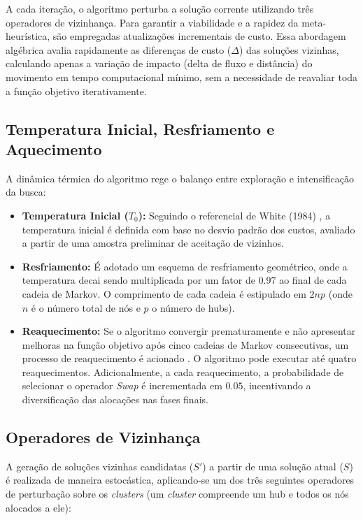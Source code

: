 A cada iteração, o algoritmo perturba a solução corrente utilizando três operadores de vizinhança. Para garantir a viabilidade e a rapidez da meta-heurística, são empregadas atualizações incrementais de custo. Essa abordagem algébrica avalia rapidamente as diferenças de custo ($\Delta$) das soluções vizinhas, calculando apenas a variação de impacto (delta de fluxo e distância) do movimento em tempo computacional mínimo, sem a necessidade de reavaliar toda a função objetivo iterativamente.

\subsection{Temperatura Inicial, Resfriamento e Aquecimento}

A dinâmica térmica do algoritmo rege o balanço entre exploração e intensificação da busca:

\begin{itemize}
    \item \textbf{Temperatura Inicial ($T_0$):} Seguindo o referencial de White (1984) \cite{white1984}, a temperatura inicial é definida com base no desvio padrão dos custos, avaliado a partir de uma amostra preliminar de aceitação de vizinhos.
    \item \textbf{Resfriamento:} É adotado um esquema de resfriamento geométrico, onde a temperatura decai sendo multiplicada por um fator de $0.97$ ao final de cada cadeia de Markov. O comprimento de cada cadeia é estipulado em $2np$ (onde $n$ é o número total de nós e $p$ o número de hubs).
    \item \textbf{Reaquecimento:} Se o algoritmo convergir prematuramente e não apresentar melhoras na função objetivo após cinco cadeias de Markov consecutivas, um processo de reaquecimento é acionado \cite{osman1993}. O algoritmo pode executar até quatro reaquecimentos. Adicionalmente, a cada reaquecimento, a probabilidade de selecionar o operador \textit{Swap} é incrementada em $0.05$, incentivando a diversificação das alocações nas fases finais.
\end{itemize}

\subsection{Operadores de Vizinhança}

A geração de soluções vizinhas candidatas ($S'$) a partir de uma solução atual ($S$) é realizada de maneira estocástica, aplicando-se um dos três seguintes operadores de perturbação sobre os \textit{clusters} (um \textit{cluster} compreende um hub e todos os nós alocados a ele):

